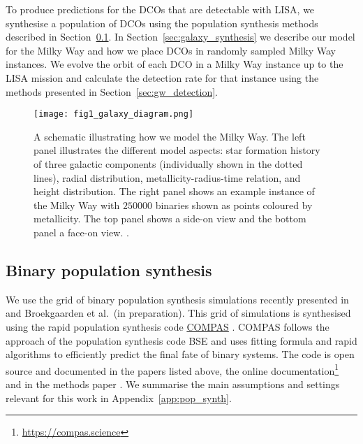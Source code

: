 To produce predictions for the DCOs that are detectable with LISA, we synthesise a population of DCOs using the population synthesis methods described in Section~\ref{sec:COMPAS_explained}. In Section~\ref{sec:galaxy_synthesis} we describe our model for the Milky Way and how we place DCOs in randomly sampled Milky Way instances. We evolve the orbit of each DCO in a Milky Way instance up to the LISA mission and calculate the detection rate for that instance using the methods presented in Section~\ref{sec:gw_detection}.

\begin{figure*}[t]
    \centering
    \texttt{[image: fig1\_galaxy\_diagram.png]}
    \caption{A schematic illustrating how we model the Milky Way. The left panel illustrates the different model aspects: star formation history of three galactic components (individually shown in the dotted lines), radial distribution, metallicity-radius-time relation, and height distribution. The right panel shows an example instance of the Milky Way with $250000$ binaries shown as points coloured by metallicity. The top panel shows a side-on view and the bottom panel a face-on view. \href{https://github.com/TomWagg/detecting-DCOs-in-LISA/blob/main/paper/figures/fig1_galaxy_diagram.png}{\faFileImage} \href{https://github.com/TomWagg/detecting-DCOs-in-LISA/blob/main/paper/figure_notebooks/galaxy_creation_station.ipynb}{\faBook}.}
    \label{fig:galaxy_schematic}
\end{figure*}

\subsection{Binary population synthesis}\label{sec:COMPAS_explained}

We use the grid of \nModels{} binary population synthesis simulations recently presented in \citet{Broekgaarden+2021} and Broekgaarden et al.\ (in preparation). This grid of simulations is synthesised using the rapid population synthesis code \href{https://compas.science}{COMPAS} \citep{Stevenson+2017,Vigna-Gomez+2018,Stevenson+2019,Broekgaarden+2019}. COMPAS follows the approach of the population synthesis code BSE \citep{Hurley+2000,Hurley+2002} and uses fitting formula and rapid algorithms to efficiently predict the final fate of binary systems. The code is open source and documented in the papers listed above, the online documentation\footnote{\url{https://compas.science}} and in the methods paper \citep{COMPAS:2021methodsPaper}. We summarise the main assumptions and settings relevant for this work in Appendix~\ref{app:pop_synth}.

